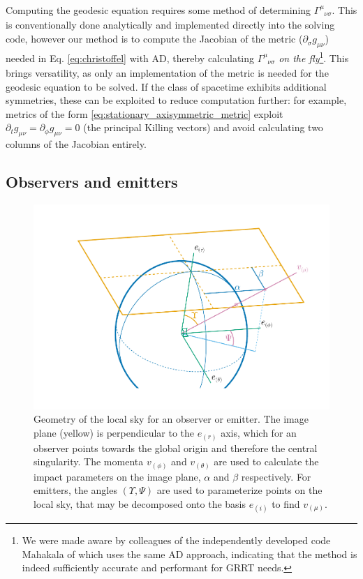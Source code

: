\documentclass[fleqn,usenatbib]{mnras}
\newcommand{\utensor}[3]{#1^{#2}_{\phantom{#2}#3}}
\begin{document}
Computing the geodesic equation requires some method of determining
$\utensor{\Gamma}{\mu}{\nu\sigma}$. This is conventionally done analytically and
implemented directly into the solving code, however our method is to compute the
Jacobian of the metric ($\partial_{\sigma} g_{\mu \nu}$) needed in Eq.
\eqref{eq:christoffel} with AD, thereby calculating
$\utensor{\Gamma}{\mu}{\nu\sigma}$ \textit{on the fly}\footnote{We were made
    aware by colleagues of the independently developed code Mahakala of
    \citet{sharma_mahakala_2023} which uses the same AD approach, indicating
that the method is indeed sufficiently accurate and performant for GRRT needs.}.
This brings versatility, as only an implementation of the metric is needed for
the geodesic equation to be solved.  If the class of spacetime exhibits
additional symmetries, these can be exploited to reduce computation further: for
example, metrics of the form \eqref{eq:stationary_axisymmetric_metric} exploit
$\partial_t g_{\mu\nu} = \partial_{\phi} g_{\mu\nu} = 0$ (the principal Killing
vectors) and avoid calculating two columns of the Jacobian entirely.

\subsection{Observers and emitters}
\label{sec:observers-and-emitters}

\begin{figure}
    \centering
    \includegraphics[width=0.99\linewidth]{figures/skycoords.pdf}
    \caption{
    Geometry of the local sky for an observer or emitter. The image plane (yellow) is
    perpendicular to the $e_{(r)}$ axis, which for an observer points towards
    the global origin and therefore the central singularity. The momenta
    $v_{(\phi)}$ and $v_{(\theta)}$ are used to calculate the impact parameters
    on the image plane, $\alpha$ and $\beta$ respectively. For emitters, the
    angles $(\Upsilon, \Psi)$ are used to parameterize points on the local sky,
    that may be decomposed onto the basis $e_{(i)}$ to find $v_{(\mu)}$.
    }
    \label{fig:observer-coordinates}
\end{figure}
\end{document}
